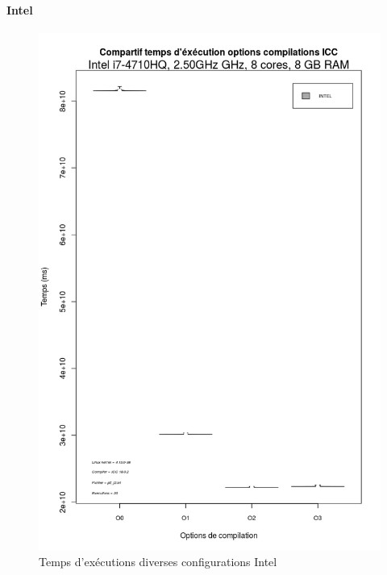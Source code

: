 \documentclass[
 aip,
 jmp,
 amsmath,amssymb,
 reprint
]{revtex4-1}
\begin{document}
\paragraph{Intel}
\begin{figure}[ht]
  \caption{Temps d'exécutions diverses configurations Intel}
  \includegraphics[width=\linewidth, keepaspectratio=true]{ICC.png}
\end{figure}
\end{document}
